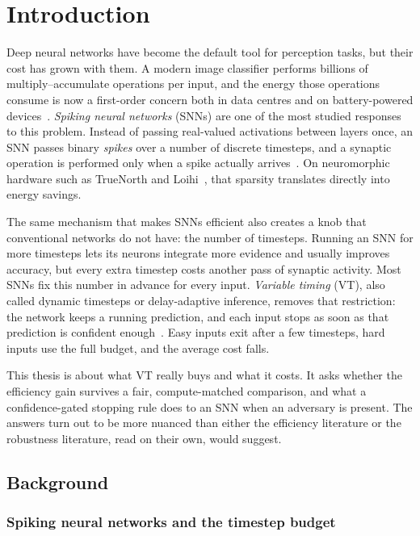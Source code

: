 \chapter{Introduction}
\label{ch:intro}

Deep neural networks have become the default tool for perception tasks, but their cost has grown with them. A modern image classifier performs billions of multiply--accumulate operations per input, and the energy those operations consume is now a first-order concern both in data centres and on battery-powered devices~\cite{horowitz2014computing}. \emph{Spiking neural networks} (SNNs) are one of the most studied responses to this problem. Instead of passing real-valued activations between layers once, an SNN passes binary \emph{spikes} over a number of discrete timesteps, and a synaptic operation is performed only when a spike actually arrives~\cite{maass1997networks, roy2019towards}. On neuromorphic hardware such as TrueNorth and Loihi~\cite{merolla2014million, davies2018loihi}, that sparsity translates directly into energy savings.

The same mechanism that makes SNNs efficient also creates a knob that conventional networks do not have: the number of timesteps. Running an SNN for more timesteps lets its neurons integrate more evidence and usually improves accuracy, but every extra timestep costs another pass of synaptic activity. Most SNNs fix this number in advance for every input. \emph{Variable timing} (VT), also called dynamic timesteps or delay-adaptive inference, removes that restriction: the network keeps a running prediction, and each input stops as soon as that prediction is confident enough~\cite{li2023unleashing, li2023input, chen2025knowing}. Easy inputs exit after a few timesteps, hard inputs use the full budget, and the average cost falls.

This thesis is about what VT really buys and what it costs. It asks whether the efficiency gain survives a fair, compute-matched comparison, and what a confidence-gated stopping rule does to an SNN when an adversary is present. The answers turn out to be more nuanced than either the efficiency literature or the robustness literature, read on their own, would suggest.

\section{Background}
\label{sec:intro-background}

\subsection{Spiking neural networks and the timestep budget}

